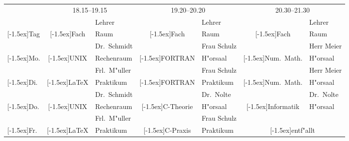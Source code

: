 \documentclass{article}
\begin{document}
\newcommand{\rb}[1]{\raisebox{1.5ex}[-1.5ex]{#1}}
\begin{center}\small
\begin{tabular}{|l||c|l|c|l|c|l|} 
\hline
& \multicolumn{2}{c|}{18.15--19.15} & \multicolumn{2}{c|}{19.20--20.20}
& \multicolumn{2}{c|}{20.30--21.30}\\ \cline{2-7}
&& Lehrer && Lehrer && Lehrer\\ \cline{3-3}\cline{5-5}\cline{7-7}
\rb{Tag} & \rb{Fach} & Raum & \rb{Fach} & Raum & \rb{Fach} & Raum\\ \hline\hline

&& Dr.\ Schmidt && Frau Schulz && Herr Meier\\
\cline{3-3}\cline{5-5}\cline{7-7}
\rb{Mo.} & \rb{UNIX} & Rechenraum & \rb{FORTRAN} & H"orsaal 
& \rb{Num.\ Math.} & H"orsaal\\ \hline 
&& Frl.\ M"uller && Frau Schulz && Herr Meier\\
\cline{3-3}\cline{5-5}\cline{7-7}
\rb{Di.} & \rb{\LaTeX} & Praktikum & \rb{FORTRAN} & Praktikum 
& \rb{Num.\ Math.} & H"orsaal\\ \hline
&& Dr.\ Schmidt && Dr.\ Nolte && Dr.\ Nolte\\
\cline{3-3}\cline{5-5}\cline{7-7}
\rb{Do.} & \rb{UNIX} & Rechenraum & \rb{C-Theorie} & H"orsaal
& \rb{Informatik} & H"orsaal\\ \hline
&& Frl.\ M"uller && Frau Schulz & \multicolumn{2}{c|}{}\\
\cline{3-3}\cline{5-5}
\rb{Fr.} & \rb{\LaTeX} & Praktikum & \rb{C-Praxis} & Praktikum 
& \multicolumn{2}{c|}{\rb{entf"allt}}\\ \hline
\end{tabular}\end{center}
\end{document}
